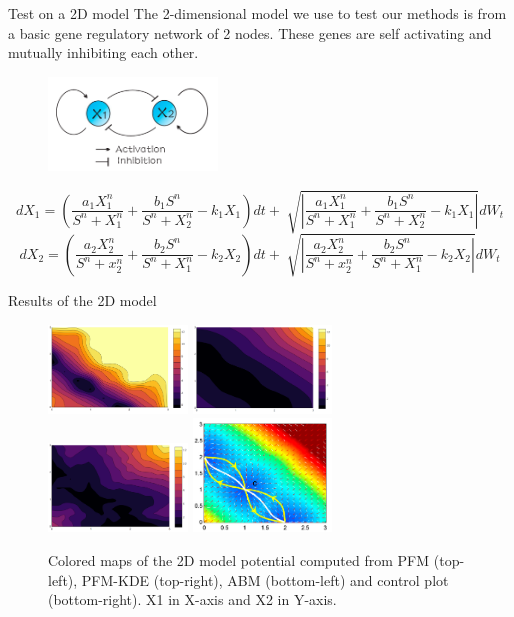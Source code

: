 \documentclass{beamer}
\begin{document}
\begin{frame}{Test on a 2D model}
The 2-dimensional model we use to test our methods is from a basic gene regulatory network of 2 nodes. These genes are self activating and mutually inhibiting each other.

\begin{figure}[!h]
\centering
\includegraphics[width=0.4\textwidth]{2Dmodel.png}
\end{figure}
\small{
\[ dX_1= \left(\frac{a_1X_1^n}{S^n+X_1^n}+\frac{b_1S^n}{S^n+X_2^n} - k_1X_1\right)dt + \sqrt[]{\left|\frac{a_1X_1^n}{S^n+X_1^n}+\frac{b_1S^n}{S^n+X_2^n} - k_1X_1\right|} dW_t\]
\[ dX_2 = \left(\frac{a_2X_2^n}{S^n+x_2^n} +\frac{b_2S^n}{S^n+X_1^n} - k_2X_2\right)dt + \sqrt[]{\left|\frac{a_2X_2^n}{S^n+x_2^n} +\frac{b_2S^n}{S^n+X_1^n} - k_2X_2\right|} dW_t\]
}
\end{frame}

\begin{frame}{Results of the 2D model}
\begin{figure}[!h]
\includegraphics[width=0.33\textwidth]{pfm_prop_2Dmodel.PNG}
\includegraphics[width=0.33\textwidth]{kde_prop_2Dmodel.PNG}
\hspace{1.1cm}
\includegraphics[width=0.33\textwidth]{abm_2Dmodel.PNG}
\includegraphics[width=0.33\textwidth]{control_2Dmodel.PNG}
\caption{Colored maps of the 2D model potential computed from PFM (top-left), PFM-KDE (top-right), ABM (bottom-left) and control plot (bottom-right). X1 in X-axis and X2 in Y-axis. }
\end{figure}
\end{frame}
\end{document}
